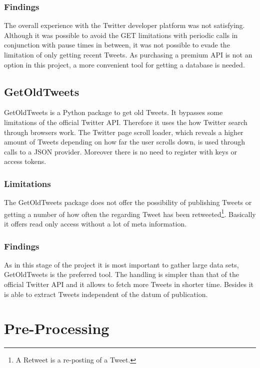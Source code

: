 \documentclass[conference]{IEEEtran}
\begin{document}
\subsubsection{Findings}

The overall experience with the Twitter developer platform was not satisfying. Although it was possible to avoid the GET limitations with periodic calls in conjunction with pause times in between, it was not possible to evade the limitation of only getting recent Tweets. As purchasing a premium API is not an option in this project, a more convenient tool for getting a database is needed.

\subsection{GetOldTweets}\label{subsec_got}

GetOldTweets \cite{got} is a Python package to get old Tweets. It bypasses some limitations of the official Twitter API. Therefore it uses the how Twitter search through browsers work. The Twitter page scroll loader, which reveals a higher amount of Tweets depending on how far the user scrolls down, is used through calls to a JSON provider. Moreover there is no need to register with keys or access tokens.

\subsubsection{Limitations}

The GetOldTweets package does not offer the possibility of publishing Tweets or getting a number of how often the regarding Tweet has been retweeted\footnote{A Retweet is a re-posting of a Tweet.}. Basically it offers read only access without a lot of meta information.

\subsubsection{Findings}

As in this stage of the project it is most important to gather large data sets, GetOldTweets is the preferred tool. The handling is simpler than that of the official Twitter API and it allows to fetch more Tweets in shorter time. Besides it is able to extract Tweets independent of the datum of publication. 

\section{Pre-Processing}
\end{document}
